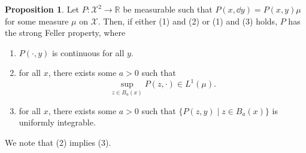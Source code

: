 \documentclass[]{article}
\theoremstyle{definition}
\theoremstyle{definition}
\newtheorem{proposition}{Proposition}[section]
\begin{document}
\begin{proposition}
  Let \(P : \mathcal{X}^2 \to \mathbb{R}\) be measurable such that 
  \(P(x, \dd y) = P(x, y)\mu\) for some measure \(\mu\) on \(\mathcal{X}\). 
  Then, if either (1) and (2) or (1) and (3) holds, \(P\) has the strong 
  Feller property, where 
  \begin{enumerate}
    \item \(P(\cdot, y)\) is continuous for all \(y\).
    \item for all \(x\), there exists some \(a > 0\) such that 
      \[\sup_{z \in B_a(x)} P(z, \cdot) \in L^1(\mu).\]
    \item for all \(x\), there exists some \(a > 0\) such that 
      \(\{P(z, y) \mid z \in B_a(x)\}\) is uniformly integrable.
  \end{enumerate}
  We note that (2) implies (3).
\end{proposition}
\end{document}
